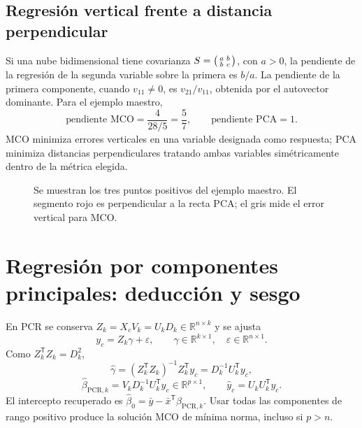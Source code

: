 \documentclass[11pt,a4paper]{article}
\newcommand{\R}{\mathbb R}
\newcommand{\T}{^{\mathsf T}}
\theoremstyle{definition}
\begin{document}
\subsection{Regresión vertical frente a distancia perpendicular}
Si una nube bidimensional tiene covarianza $S=\begin{psmallmatrix}a&b\\b&c\end{psmallmatrix}$, con $a>0$, la pendiente de la regresión de la segunda variable sobre la primera es $b/a$. La pendiente de la primera componente, cuando $v_{11}\ne0$, es $v_{21}/v_{11}$, obtenida por el autovector dominante. Para el ejemplo maestro,
\[
\text{pendiente MCO}=\frac{4}{28/5}=\frac57,\qquad
\text{pendiente PCA}=1.
\]
MCO minimiza errores verticales en una variable designada como respuesta; PCA minimiza distancias perpendiculares tratando ambas variables simétricamente dentro de la métrica elegida.
\begin{figure}[H]\centering
{}
\caption{Se muestran los tres puntos positivos del ejemplo maestro. El segmento rojo es perpendicular a la recta PCA; el gris mide el error vertical para MCO.}
\end{figure}

\section{Regresión por componentes principales: deducción y sesgo}
En PCR se conserva $Z_k=X_cV_k=U_kD_k\in\R^{n\times k}$ y se ajusta
\[
y_c=Z_k\gamma+\varepsilon,\qquad \gamma\in\R^{k\times1},\quad\varepsilon\in\R^{n\times1}.
\]
Como $Z_k\T Z_k=D_k^2$,
\[
\widehat\gamma=(Z_k\T Z_k)^{-1}Z_k\T y_c=D_k^{-1}U_k\T y_c,
\]
\[
\boxed{\widehat\beta_{\mathrm{PCR},k}=V_kD_k^{-1}U_k\T y_c\in\R^{p\times1}},\qquad
\widehat y_c=U_kU_k\T y_c.
\]
El intercepto recuperado es $\widehat\beta_0=\bar y-\bar x\T\widehat\beta_{\mathrm{PCR},k}$. Usar todas las componentes de rango positivo produce la solución MCO de mínima norma, incluso si $p>n$.
\end{document}
